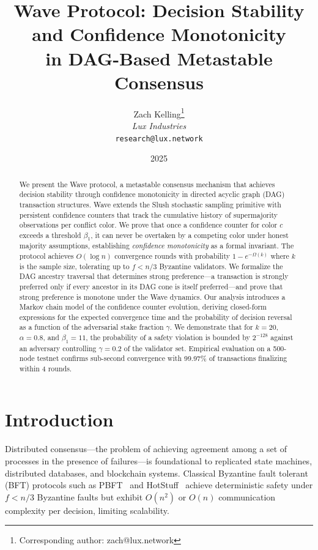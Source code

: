 \documentclass[11pt,a4paper]{article}
\title{\textbf{Wave Protocol: Decision Stability and Confidence Monotonicity\\in DAG-Based Metastable Consensus}}
\author{
Zach Kelling\thanks{Corresponding author: zach@lux.network}\\
\textit{Lux Industries}\\
\texttt{research@lux.network}
}
\date{2025}
\begin{document}
\luxcoverpage
\maketitle

\begin{abstract}
We present the Wave protocol, a metastable consensus mechanism that achieves decision stability
through confidence monotonicity in directed acyclic graph (DAG) transaction structures.
Wave extends the Slush stochastic sampling primitive with persistent confidence counters
that track the cumulative history of supermajority observations per conflict color.
We prove that once a confidence counter for color $c$ exceeds a threshold $\beta_1$,
it can never be overtaken by a competing color under honest majority assumptions,
establishing \emph{confidence monotonicity} as a formal invariant.
The protocol achieves $O(\log n)$ convergence rounds with probability $1 - e^{-\Omega(k)}$
where $k$ is the sample size, tolerating up to $f < n/3$ Byzantine validators.
We formalize the DAG ancestry traversal that determines strong preference---a transaction
is strongly preferred only if every ancestor in its DAG cone is itself preferred---and
prove that strong preference is monotone under the Wave dynamics.
Our analysis introduces a Markov chain model of the confidence counter evolution,
deriving closed-form expressions for the expected convergence time and the probability
of decision reversal as a function of the adversarial stake fraction $\gamma$.
We demonstrate that for $k = 20$, $\alpha = 0.8$, and $\beta_1 = 11$, the probability
of a safety violation is bounded by $2^{-128}$ against an adversary controlling
$\gamma = 0.2$ of the validator set. Empirical evaluation on a 500-node testnet
confirms sub-second convergence with 99.97\% of transactions finalizing within 4 rounds.
\end{abstract}

\tableofcontents
\newpage

\section{Introduction}
\label{sec:introduction}

Distributed consensus---the problem of achieving agreement among a set of processes in
the presence of failures---is foundational to replicated state machines, distributed
databases, and blockchain systems. Classical Byzantine fault tolerant (BFT) protocols
such as PBFT~\cite{castro1999practical} and HotStuff~\cite{yin2019hotstuff} achieve
deterministic safety under $f < n/3$ Byzantine faults but exhibit $O(n^2)$ or $O(n)$
communication complexity per decision, limiting scalability.
\end{document}

